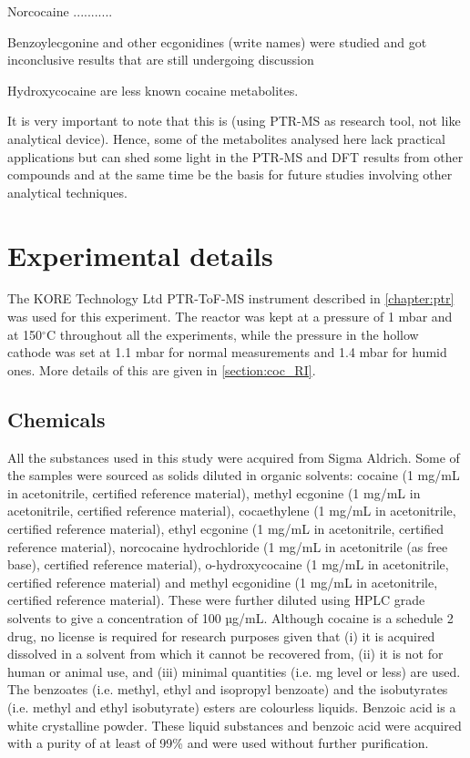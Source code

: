 Norcocaine ...........




Benzoylecgonine and other ecgonidines (write names) were studied and got inconclusive results that are still undergoing discussion


Hydroxycocaine are less known cocaine metabolites.








It is very important to note that this is (using PTR-MS as research tool, not like analytical device).
Hence, some of the metabolites analysed here lack practical applications but can shed some light in the PTR-MS and DFT results from other compounds and at the same time be the basis for future studies involving other analytical techniques.







 
\section{Experimental details}
The KORE Technology Ltd PTR-ToF-MS instrument described in \autoref{chapter:ptr} was used for this experiment. 
The reactor was kept at a pressure of 1 mbar and at 150$^\circ$C throughout all the experiments, while the pressure in the hollow cathode was set at 1.1 mbar for normal measurements and 1.4 mbar for humid ones. More details of this are given in \autoref{section:coc_RI}.


\subsection{Chemicals}
All the substances used in this study were acquired from Sigma Aldrich. Some of the samples were sourced as solids diluted in organic solvents: cocaine (1 mg/mL in acetonitrile, certified reference material), methyl ecgonine (1 mg/mL in acetonitrile, certified reference material), cocaethylene (1 mg/mL in acetonitrile, certified reference material), ethyl ecgonine (1 mg/mL in acetonitrile, certified reference material), norcocaine hydrochloride (1 mg/mL in acetonitrile (as free base), certified reference material), o-hydroxycocaine (1 mg/mL in acetonitrile, certified reference material) and methyl ecgonidine (1 mg/mL in acetonitrile, certified reference material). These were further diluted using HPLC grade solvents to give a concentration of 100 µg/mL. Although cocaine is a schedule 2 drug, no license is required for research purposes given that (i) it is acquired dissolved in a solvent from which it cannot be recovered from, (ii) it is not for human or animal use, and (iii) minimal quantities (i.e. mg level or less) are used.
The benzoates (i.e. methyl, ethyl and isopropyl benzoate) and the isobutyrates (i.e. methyl and ethyl isobutyrate) esters are colourless liquids. Benzoic acid is a white crystalline powder. These liquid substances and benzoic acid were acquired with a purity of at least of 99\% and were used without further purification.



